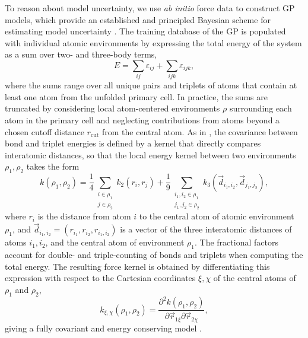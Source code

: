 \documentclass[%
superscriptaddress,
preprint,
linenumbers,
amsmath,amssymb,
aps,
prl,
]{revtex4-1}
\begin{document}
To reason about model uncertainty, we use \textit{ab initio} force data to construct GP models, which provide an established and principled Bayesian scheme for estimating model uncertainty \cite{rasmussen2003gaussian}. The training database of the GP is populated with individual atomic environments by expressing the total energy of the system as a sum over two- and three-body terms,
\begin{equation}
E = \sum_{ij} \varepsilon_{ij} + \sum_{ijk} \varepsilon_{ijk},
\label{en_mod}
\end{equation}
where the sums range over all unique pairs and triplets of atoms that contain at least one atom from the unfolded primary cell. In practice, the sums are truncated by considering local atom-centered environments $\rho$ surrounding each atom in the primary cell and neglecting contributions from atoms beyond a chosen cutoff distance $r_{\text{cut}}$ from the central atom. As in \cite{glielmo2018efficient}, the covariance between bond and triplet energies is defined by a kernel that directly compares interatomic distances, so that the local energy kernel between two environments $\rho_1, \rho_2$ takes the form
\begin{equation}
k(\rho_1, \rho_2) = \frac{1}{4} \sum\limits_{\substack{i\in\rho_1 \\ j\in\rho_2}}k_2(r_i, r_j) + \frac{1}{9} \sum\limits_{\substack{i_1, i_2 \in \rho_1 \\ j_1, j_2 \in \rho_2}} k_3(\vec{d}_{i_1, i_2}, \vec{d}_{j_1, j_2}),
\end{equation}
where $r_i$ is the distance from atom $i$ to the central atom of atomic environment $\rho_1$, and $\vec{d}_{i_1, i_2} = (r_{i_1}, r_{i_2}, r_{i_1, i_2})$ is a vector of the three interatomic distances of atoms $i_1, i_2$, and the central atom of environment $\rho_1$. The fractional factors account for double- and triple-counting of bonds and triplets when computing the total energy. The resulting force kernel is obtained by differentiating this expression with respect to the Cartesian coordinates $\xi, \chi$ of the central atoms of $\rho_1$ and $\rho_2$,
\begin{equation}
k_{\xi,\chi}(\rho_1, \rho_2) = \frac{\partial^2 k(\rho_1, \rho_2)}{\partial \vec{r}_{1\xi} \partial \vec{r}_{2\chi}},
\end{equation}
giving a fully covariant and energy conserving model \cite{glielmo2017accurate, glielmo2018efficient, chmiela2017machine}.
\end{document}
